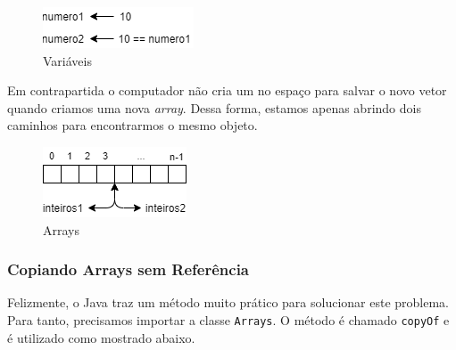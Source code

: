 \documentclass[
]{book}
\begin{document}
\begin{figure}
\centering
\includegraphics{imagens/Java.png}
\caption{Variáveis}
\end{figure}

Em contrapartida o computador não cria um no espaço para salvar o novo vetor quando criamos uma nova \emph{array}. Dessa forma, estamos apenas abrindo dois caminhos para encontrarmos o mesmo objeto.

\begin{figure}
\centering
\includegraphics{imagens/arrays.png}
\caption{Arrays}
\end{figure}

\hypertarget{copiando-arrays-sem-referuxeancia}{%
\subsubsection{Copiando Arrays sem Referência}\label{copiando-arrays-sem-referuxeancia}}

Felizmente, o Java traz um método muito prático para solucionar este problema. Para tanto, precisamos importar a classe \texttt{Arrays}. O método é chamado \texttt{copyOf} e é utilizado como mostrado abaixo.
\end{document}
